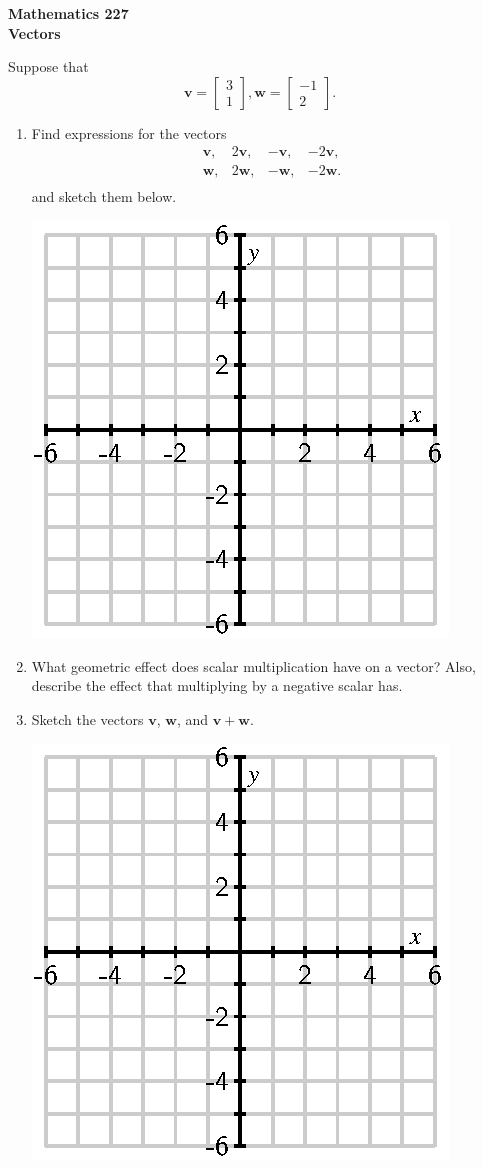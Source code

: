 \documentclass[12pt]{article}
\newcommand{\vs}[1]{\vspace{#1in}}
\newcommand{\vvec}{{\mathbf v}}
\newcommand{\wvec}{{\mathbf w}}
\newcommand{\twovec}[2]{\left[\begin{array}{r}#1 \\ #2
    \end{array}\right]}
\begin{document}
\noindent
{\bf Mathematics 227} \\ 
{\bf Vectors}

\bigskip
Suppose that
$$
\vvec = \twovec{3}{1}, \wvec=\twovec{-1}{2}.
$$

\begin{enumerate}
\item Find expressions for the vectors
  $$
  \begin{array}{cccc}
    \vvec, & 2\vvec, & -\vvec, & -2\vvec, \\
    \wvec, & 2\wvec, & -\wvec, & -2\wvec. \\
  \end{array}
  $$
  and sketch them below.

  \bigskip
  \includegraphics{empty-6.eps}

\item What geometric effect does scalar multiplication have on a
  vector?  Also, describe the effect that multiplying by a negative
  scalar has.

  \vs{1}

\item Sketch the vectors $\vvec$, $\wvec$, and $\vvec+\wvec$.
  
  \bigskip
  \includegraphics{empty-6.eps}


\end{enumerate}
\end{document}
